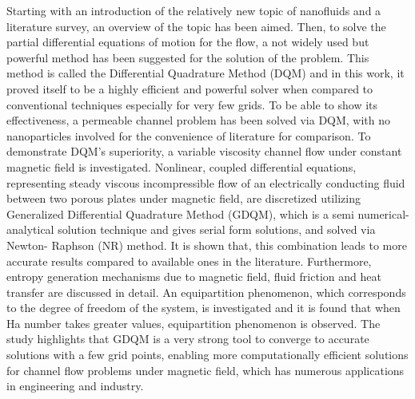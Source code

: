 Starting with an introduction of the relatively new topic of nanofluids and a literature survey, an overview of the topic has been aimed. Then, to solve the partial differential equations of motion for the flow, a not widely used but powerful method has been suggested for the solution of the problem. This method is called the Differential Quadrature Method (DQM) and in this work, it proved itself to be a highly efficient and powerful solver when compared to conventional techniques especially for very few grids. To be able to show its effectiveness, a permeable channel problem has been solved via DQM, with no nanoparticles involved for the convenience of literature for comparison. To demonstrate DQM's superiority, a variable viscosity channel flow under constant magnetic field is investigated. Nonlinear, coupled differential equations, representing steady viscous incompressible flow of an electrically conducting fluid between two porous plates under magnetic field, are discretized utilizing Generalized Differential Quadrature Method (GDQM), which is a semi numerical-analytical solution technique and gives serial form solutions, and solved via Newton- Raphson (NR) method. It is shown that, this combination leads to more accurate results compared to available ones in the literature. Furthermore, entropy generation mechanisms due to magnetic field, fluid friction and heat transfer are discussed in detail. An equipartition phenomenon, which corresponds to the degree of freedom of the system, is investigated and it is found that when Ha number takes greater values, equipartition phenomenon is observed. The study highlights that GDQM is a very strong tool to converge to accurate solutions with a few grid points, enabling more computationally efficient solutions for channel flow problems under magnetic field, which has numerous applications in engineering and industry. 

